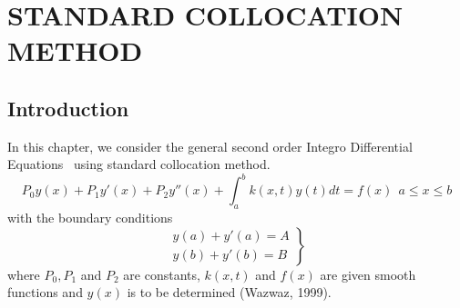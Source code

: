 \documentclass[12pt]{report}
\newcommand{\IDEs}{Integro Differential Equations}
\newcommand{\sprime}{'}
\newcommand{\dprime}{''}
\begin{document}
	
	\newpage
	
	\chapter{STANDARD COLLOCATION METHOD}
	
	\section{Introduction}
	In this chapter, we consider the general second order \IDEs~ using standard collocation method.
	\begin{equation}
		P_0y(x) + P_1y\sprime(x) + P_2y\dprime(x) + \int_a^b k(x,t)y(t)dt=f(x)~~ a \leq x \leq b \label{eq:3_1}
	\end{equation}
	with the boundary conditions
	\begin{equation}
		\left.
		\begin{array}{c}
			y(a) + y\sprime(a) = A\\
			y(b) + y\sprime(b) = B
		\end{array}\right\}
		\label{eq:3_2}
	\end{equation}
	where $P_0, P_1$ and $P_2$ are constants, $k(x,t)$ and $f(x)$ are given smooth functions and $y(x)$ is to be determined (Wazwaz, 1999).
	
\end{document}
